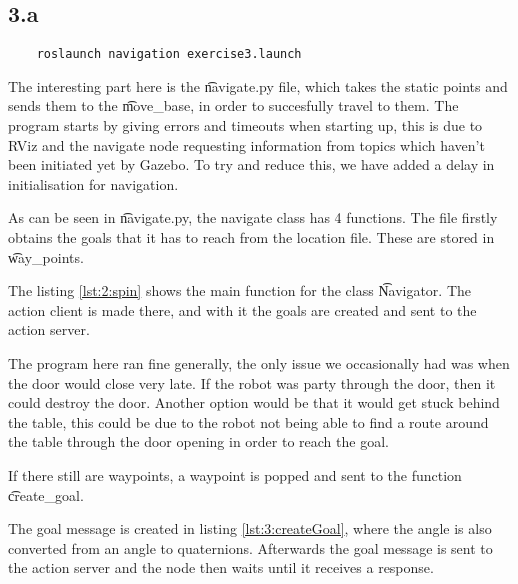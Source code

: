 
\subsection*{3.a}
\begin{lstlisting}
	roslaunch navigation exercise3.launch
\end{lstlisting}

The interesting part here is the \t{navigate.py} file, which takes the static points and sends them to the \t{move_base}, in order to succesfully travel to them. The program starts by giving errors and timeouts when starting up, this is due to RViz and the navigate node requesting information from topics which haven't been initiated yet by Gazebo. To try and reduce this, we have added a delay in initialisation for navigation.

As can be seen in \t{navigate.py}, the navigate class has 4 functions. The file firstly obtains the goals that it has to reach from the location file. These are stored in \t{way_points}.




The listing \ref{lst:2:spin} shows the main function for the class \t{Navigator}. The action client is made there, and with it the goals are created and sent to the action server.

The program here ran fine generally, the only issue we occasionally had was when the door would close very late. If the robot was party through the door, then it could destroy the door. Another option would be that it would get stuck behind the table, this could be due to the robot not being able to find a route around the table through the door opening in order to reach the goal.

If there still are waypoints, a waypoint is popped and sent to the function \t{create_goal}.



The goal message is created in listing \ref{lst:3:createGoal}, where the angle is also converted from an angle to quaternions. Afterwards the goal message is sent to the action server and the node then waits until it receives a response. 



